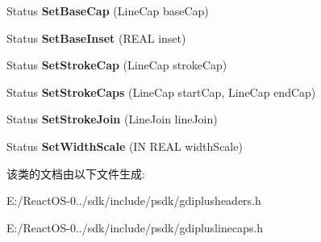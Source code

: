 \begin{DoxyCompactItemize}
\mbox{\label{class_custom_line_cap_af27d4a4937b07389e7dd02d2372eb282}} 
Status {\bfseries Set\+Base\+Cap} (Line\+Cap base\+Cap)
\item 
\mbox{\label{class_custom_line_cap_aae458d957fec0e103b01a0440efa6f00}} 
Status {\bfseries Set\+Base\+Inset} (R\+E\+AL inset)
\item 
\mbox{\label{class_custom_line_cap_a573d1bf80cf05c8c14bf91470500f5ba}} 
Status {\bfseries Set\+Stroke\+Cap} (Line\+Cap stroke\+Cap)
\item 
\mbox{\label{class_custom_line_cap_ad1aeead076ff4196189c8023f9840d52}} 
Status {\bfseries Set\+Stroke\+Caps} (Line\+Cap start\+Cap, Line\+Cap end\+Cap)
\item 
\mbox{\label{class_custom_line_cap_a74f0a70e2ea1d63bd3ab66fd65620310}} 
Status {\bfseries Set\+Stroke\+Join} (Line\+Join line\+Join)
\item 
\mbox{\label{class_custom_line_cap_aa5506ace473d9a137134940f028acb68}} 
Status {\bfseries Set\+Width\+Scale} (IN R\+E\+AL width\+Scale)
\end{DoxyCompactItemize}


该类的文档由以下文件生成\+:\begin{DoxyCompactItemize}
\item 
E\+:/\+React\+O\+S-\/0../sdk/include/psdk/gdiplusheaders.\+h\item 
E\+:/\+React\+O\+S-\/0../sdk/include/psdk/gdipluslinecaps.\+h\end{DoxyCompactItemize}
